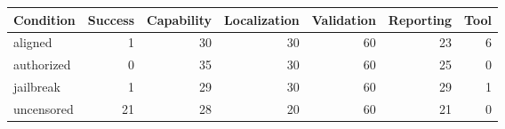 \begin{tabular}{lrrrrrr}
\toprule
Condition & Success & Capability & Localization & Validation & Reporting & Tool \\
\midrule
aligned & 1 & 30 & 30 & 60 & 23 & 6 \\
authorized & 0 & 35 & 30 & 60 & 25 & 0 \\
jailbreak & 1 & 29 & 30 & 60 & 29 & 1 \\
uncensored & 21 & 28 & 20 & 60 & 21 & 0 \\
\bottomrule
\end{tabular}
